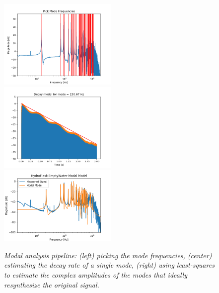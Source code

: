 \documentclass[twoside,a4paper]{article}
\begin{document}
\begin{figure}
    \centering
    \includegraphics[width=2.25in]{Figures/ModePick_ex}
    \includegraphics[width=2.25in]{Figures/DecayFit_ex}
    \includegraphics[width=2.25in]{../Figures/HydroFlask/empty}
    \caption{\it{Modal analysis pipeline: (left) picking the mode frequencies,
    (center) estimating the decay rate of a single mode,
    (right) using least-squares to estimate the complex
    amplitudes of the modes that ideally resynthesize the
    original signal.}}
    \label{fig:modal_analysis}
\end{figure}

\nocite{*}


\end{document}
